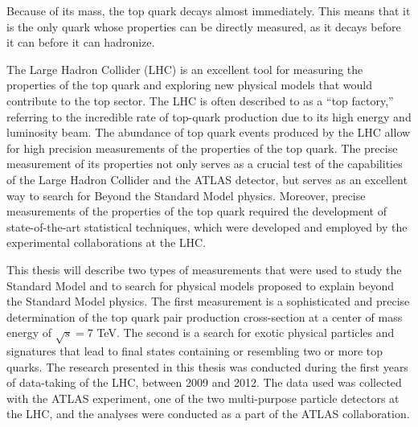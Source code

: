 Because of its mass, the top quark decays almost immediately.
This means that it is the only quark whose properties can be directly measured,
as it decays before it can before it can hadronize.

The Large Hadron Collider (LHC) is an excellent tool for measuring the properties of the top quark
and exploring new physical models that would contribute to the top sector.
The LHC is often described to as a ``top factory,'' referring to the incredible rate of top-quark production due to its high energy and luminosity beam.
The abundance of top quark events produced by the LHC allow for high precision measurements of the properties of the top quark.
The precise measurement of its properties not only serves as a crucial test of the capabilities of the Large Hadron Collider and the ATLAS detector,
but serves as an excellent way to search for Beyond the Standard Model physics.
Moreover, precise measurements of the properties of the top quark required the development of state-of-the-art statistical techniques,
which were developed and employed by the experimental collaborations at the LHC.

This thesis will describe two types of measurements that were used to study the Standard Model and to search for physical models proposed to explain beyond the Standard Model physics.
The first measurement is a sophisticated and precise determination of the top quark pair production cross-section at a center of mass energy of $\sqrt{s} = 7$ TeV.
The second is a search for exotic physical particles and signatures that lead to final states containing or resembling two or more top quarks.
The research presented in this thesis was conducted during the first years of data-taking of the LHC, between 2009 and 2012.
The data used was collected with the ATLAS experiment, one of the two multi-purpose particle detectors at the LHC,
and the analyses were conducted as a part of the ATLAS collaboration.

